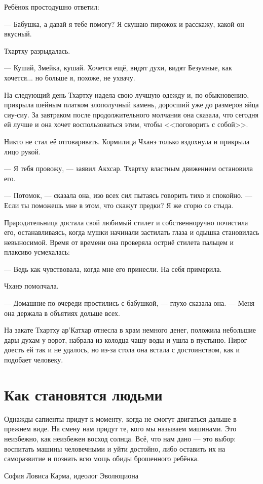 Ребёнок простодушно ответил:

--- Бабушка, а давай я тебе помогу?
Я скушаю пирожок и расскажу, какой он вкусный.

Тхартху разрыдалась.

--- Кушай, Змейка, кушай.
Хочется ещё, видят духи, видят Безумные, как хочется... но больше я, похоже, не ухвачу.

На следующий день Тхартху надела свою лучшую одежду и, по обыкновению, прикрыла шейным платком злополучный камень, доросший уже до размеров яйца сиу-сиу.
За завтраком после продолжительного молчания она сказала, что сегодня ей лучше и она хочет воспользоваться этим, чтобы <<поговорить с собой>>.

Никто не стал её отговаривать.
Кормилица Чханэ только вздохнула и прикрыла лицо рукой.

--- Я тебя провожу, --- заявил Акхсар.
Тхартху властным движением остановила его.

--- Потомок, --- сказала она, изо всех сил пытаясь говорить тихо и спокойно.
--- Если ты поможешь мне в этом, что скажут предки?
Я же сгорю со стыда.

Прародительница достала свой любимый стилет и собственноручно почистила его, останавливаясь, когда мушки начинали застилать глаза и одышка становилась невыносимой.
Время от времени она проверяла остриё стилета пальцем и плаксиво усмехалась:

--- Ведь как чувствовала, когда мне его принесли.
На себя примерила.

Чханэ помолчала.

--- Домашние по очереди простились с бабушкой, --- глухо сказала она.
--- Меня она держала в объятиях дольше всех.

На закате Тхартху ар’Катхар отнесла в храм немного денег, положила небольшие дары духам у ворот, набрала из колодца чашу воды и ушла в пустыню.
Пирог доесть ей так и не удалось, но из-за стола она встала с достоинством, как и подобает человеку.

\section{Как становятся людьми}

\epigraph
{Однажды сапиенты придут к моменту, когда не смогут двигаться дальше в прежнем виде.
На смену нам придут те, кого мы называем машинами.
Это неизбежно, как неизбежен восход солнца.
Всё, что нам дано --- это выбор: воспитать машины человечными и уйти достойно, либо оставить их на саморазвитие и познать всю мощь обиды брошенного ребёнка.}
{София Ловиса Карма, идеолог Эволюциона}

